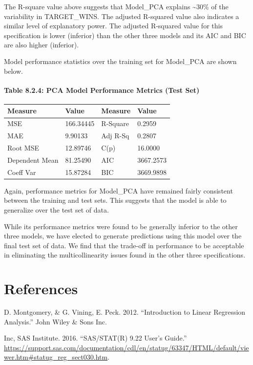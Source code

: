 \documentclass[]{article}
\let\oldparagraph\paragraph
\renewcommand{\paragraph}[1]{\oldparagraph{#1}\mbox{}}
\begin{document}
The R-square value above suggests that Model\_PCA explains
\textasciitilde{}30\% of the variability in TARGET\_WINS. The adjusted
R-squared value also indicates a similar level of explanatory power. The
adjusted R-squared value for this specification is lower (inferior) than
the other three models and its AIC and BIC are also higher (inferior).

Model performance statistics over the training set for Model\_PCA are
shown below.

\paragraph{Table 8.2.4: PCA Model Performance Metrics (Test
Set)}\label{table-8.2.4-pca-model-performance-metrics-test-set}

\begin{longtable}[]{@{}llll@{}}
\toprule
Measure & Value & Measure & Value\tabularnewline
\midrule
\endhead
MSE & 166.34445 & R-Square & 0.2959\tabularnewline
MAE & 9.90133 & Adj R-Sq & 0.2807\tabularnewline
Root MSE & 12.89746 & C(p) & 16.0000\tabularnewline
Dependent Mean & 81.25490 & AIC & 3667.2573\tabularnewline
Coeff Var & 15.87284 & BIC & 3669.9898\tabularnewline
\bottomrule
\end{longtable}

Again, performance metrics for Model\_PCA have remained fairly
consistent between the training and test sets. This suggests that the
model is able to generalize over the test set of data.

While its performance metrics were found to be generally inferior to the
other three models, we have elected to generate predictions using this
model over the final test set of data. We find that the trade-off in
performance to be acceptable in eliminating the multicollinearity issues
found in the other three specifications.

\newpage

\section*{References}\label{references}

\hypertarget{refs}{}
\hypertarget{ref-Mont2012}{}
D. Montgomery, \& G. Vining, E. Peck. 2012. ``Introduction to Linear
Regression Analysis.'' John Wiley \& Sons Inc.

\hypertarget{ref-Sasi2016}{}
Inc, SAS Institute. 2016. ``SAS/STAT(R) 9.22 User's Guide.''
\url{https://support.sas.com/documentation/cdl/en/statug/63347/HTML/default/viewer.htm\#statug_reg_sect030.htm}.
\end{document}
